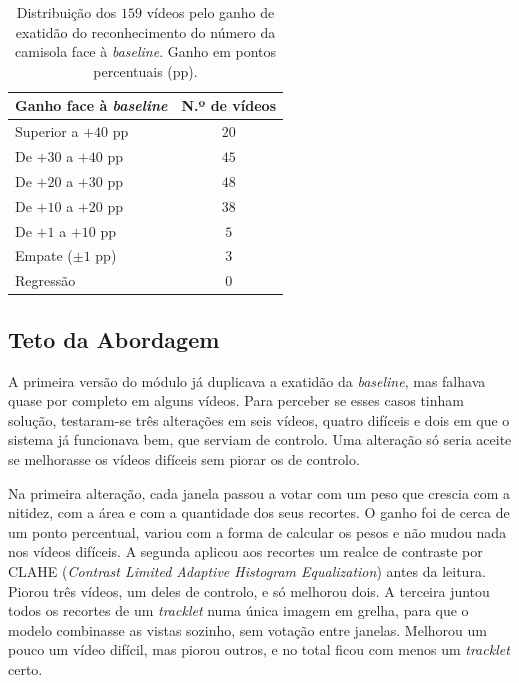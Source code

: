 \begin{table}[H]
    \centering
    \caption{Distribuição dos $159$ vídeos pelo ganho de exatidão do reconhecimento do número da camisola face à \emph{baseline}. Ganho em pontos percentuais (pp).}
    \label{tab:jnr-distribuicao}
    \begin{tabular}{|l|c|}
        \hline
        \textbf{Ganho face à \emph{baseline}} & \textbf{N.º de vídeos} \\
        \hline
        Superior a $+40$ pp & $20$ \\
        \hline
        De $+30$ a $+40$ pp & $45$ \\
        \hline
        De $+20$ a $+30$ pp & $48$ \\
        \hline
        De $+10$ a $+20$ pp & $38$ \\
        \hline
        De $+1$ a $+10$ pp  & $5$ \\
        \hline
        Empate ($\pm 1$ pp) & $3$ \\
        \hline
        Regressão           & $0$ \\
        \hline
    \end{tabular}
\end{table}

\subsection{Teto da Abordagem}\label{sec:res_jnr_teto}

A primeira versão do módulo já duplicava a exatidão da \emph{baseline}, mas falhava quase por completo em alguns vídeos. Para perceber se esses casos tinham solução, testaram-se três alterações em seis vídeos, quatro difíceis e dois em que o sistema já funcionava bem, que serviam de controlo. Uma alteração só seria aceite se melhorasse os vídeos difíceis sem piorar os de controlo.

Na primeira alteração, cada janela passou a votar com um peso que crescia com a nitidez, com a área e com a quantidade dos seus recortes. O ganho foi de cerca de um ponto percentual, variou com a forma de calcular os pesos e não mudou nada nos vídeos difíceis. A segunda aplicou aos recortes um realce de contraste por CLAHE (\emph{Contrast Limited Adaptive Histogram Equalization}) antes da leitura. Piorou três vídeos, um deles de controlo, e só melhorou dois. A terceira juntou todos os recortes de um \emph{tracklet} numa única imagem em grelha, para que o modelo combinasse as vistas sozinho, sem votação entre janelas. Melhorou um pouco um vídeo difícil, mas piorou outros, e no total ficou com menos um \emph{tracklet} certo.

